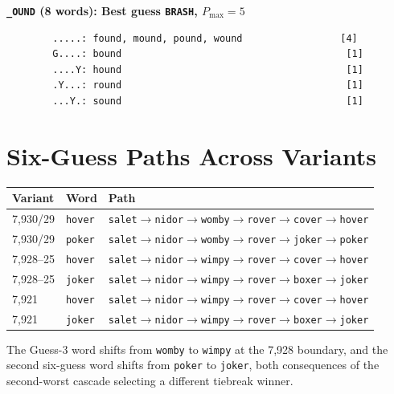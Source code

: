 \documentclass[11pt]{article}
\begin{document}
	\textbf{\texttt{\_OUND} (8 words): Best guess \texttt{BRASH}, $P_{\max} = 5$}
	
	\begin{verbatim}
		.....: found, mound, pound, wound                 [4]
		G....: bound                                       [1]
		....Y: hound                                       [1]
		.Y...: round                                       [1]
		...Y.: sound                                       [1]
	\end{verbatim}
	
	\section{Six-Guess Paths Across Variants}
	
	\begin{center}
		\begin{tabular}{@{}lll@{}}
			\toprule
			Variant & Word & Path \\
			\midrule
			7,930/29 & \texttt{hover} & \texttt{salet}$\to$\texttt{nidor}$\to$\texttt{womby}$\to$\texttt{rover}$\to$\texttt{cover}$\to$\texttt{hover} \\
			7,930/29 & \texttt{poker} & \texttt{salet}$\to$\texttt{nidor}$\to$\texttt{womby}$\to$\texttt{rover}$\to$\texttt{joker}$\to$\texttt{poker} \\
			\midrule
			7,928--25 & \texttt{hover} & \texttt{salet}$\to$\texttt{nidor}$\to$\texttt{wimpy}$\to$\texttt{rover}$\to$\texttt{cover}$\to$\texttt{hover} \\
			7,928--25 & \texttt{joker} & \texttt{salet}$\to$\texttt{nidor}$\to$\texttt{wimpy}$\to$\texttt{rover}$\to$\texttt{boxer}$\to$\texttt{joker} \\
			\midrule
			7,921 & \texttt{hover} & \texttt{salet}$\to$\texttt{nidor}$\to$\texttt{wimpy}$\to$\texttt{rover}$\to$\texttt{cover}$\to$\texttt{hover} \\
			7,921 & \texttt{joker} & \texttt{salet}$\to$\texttt{nidor}$\to$\texttt{wimpy}$\to$\texttt{rover}$\to$\texttt{boxer}$\to$\texttt{joker} \\
			\bottomrule
		\end{tabular}
	\end{center}
	
	The Guess-3 word shifts from \texttt{womby} to \texttt{wimpy} at the 7,928 boundary, and the second six-guess word shifts from \texttt{poker} to \texttt{joker}, both consequences of the second-worst cascade selecting a different tiebreak winner.
	
\end{document}
